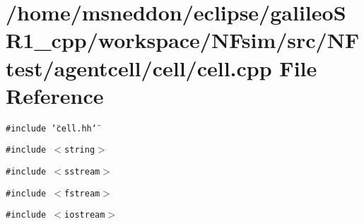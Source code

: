 \section{/home/msneddon/eclipse/galileoSR1\_\-cpp/workspace/NFsim/src/NFtest/agentcell/cell/cell.cpp File Reference}
\label{cell_8cpp}


{\tt \#include \char`\"{}cell.hh\char`\"{}}\par
{\tt \#include $<$string$>$}\par
{\tt \#include $<$sstream$>$}\par
{\tt \#include $<$fstream$>$}\par
{\tt \#include $<$iostream$>$}\par
